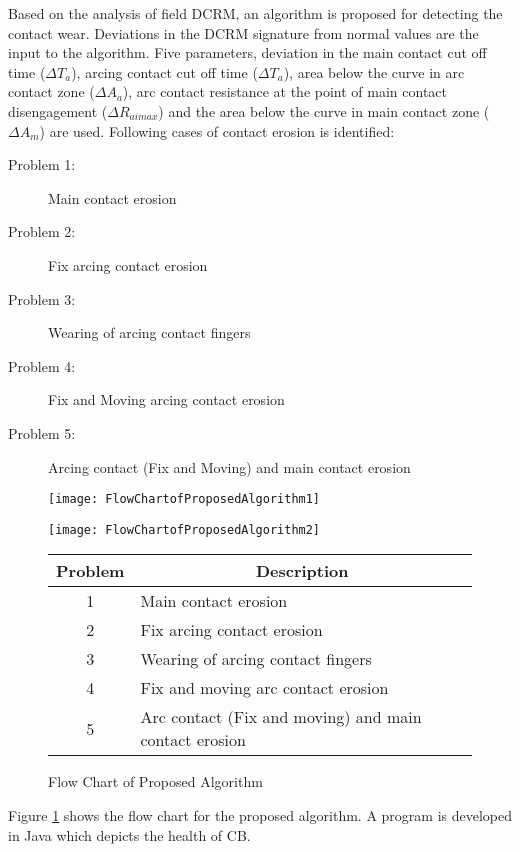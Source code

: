Based on the analysis of field DCRM, an algorithm is proposed for detecting the contact wear. Deviations in the DCRM signature from normal values are the input to the algorithm. Five parameters, deviation in the main contact cut off time ($\Delta T_a$), arcing contact cut off time ($\Delta T_a$), area below the curve in arc contact zone ($\Delta A_a$), arc contact resistance at the point of main contact disengagement ($\Delta R_{aimax}$) and the area below the curve in main contact zone ($\Delta A_m$) are used. Following cases of contact erosion is identified:
\clearpage

\begin{description}
\item[Problem 1:] Main contact erosion
\item[Problem 2:] Fix arcing contact erosion
\item[Problem 3:] Wearing of arcing contact fingers
\item[Problem 4:] Fix and Moving arcing contact erosion
\item[Problem 5:] Arcing contact (Fix and Moving) and main contact erosion
\end{description}

\begin{figure}[!ht]
\centering
    \texttt{[image: FlowChartofProposedAlgorithm1]}
\end{figure}
\begin{figure}[!ht]
\centering
    \texttt{[image: FlowChartofProposedAlgorithm2]}
\end{figure}
\clearpage
\begin{figure}[H]
    \centering
    \begin{tabular}{| c | l |}
	\hline
	\textbf{Problem} & \multicolumn{1}{|c|}{\textbf{Description}} \\ \hline
	1					& Main contact erosion \\ \hline
	2					& Fix arcing contact erosion \\ \hline
	3					& Wearing of arcing contact fingers \\ \hline
	4					& Fix and moving arc contact erosion \\ \hline
	5					& Arc contact (Fix and moving) and main contact erosion\\ \hline
	\end{tabular}
    \caption{Flow Chart of Proposed Algorithm}
    \label{fig:Flow Chart of Proposed Algorithm}
\end{figure}

Figure \ref{fig:Flow Chart of Proposed Algorithm} shows the flow chart for the proposed algorithm. A program is developed in Java which depicts the health of CB.


